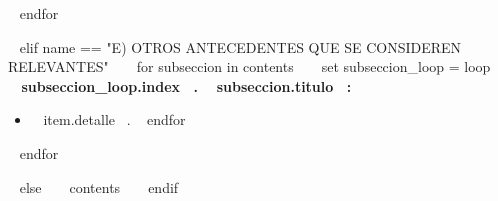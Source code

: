   ~{ endfor }~
  \espacioEntreSecciones{}


~{ elif name == "E) OTROS ANTECEDENTES QUE SE CONSIDEREN RELEVANTES" }~
  ~{ for subseccion in contents }~
    ~{ set subseccion_loop = loop }~
    \textbf{~{{ subseccion_loop.index }}~. ~{{ subseccion.titulo }}~:}
    \begin{itemize}
    ~{ for item in subseccion.antecedentes }~
      \item ~{{ item.detalle }}~.
      \espacioEntreItems{}
    ~{ endfor }~
    \end{itemize}
    \espacioEntreSubSecciones{}

  ~{ endfor }~
  \espacioEntreSecciones{}


~{ else }~
  ~{{ contents }}~
  \bigskip
~{ endif }~


